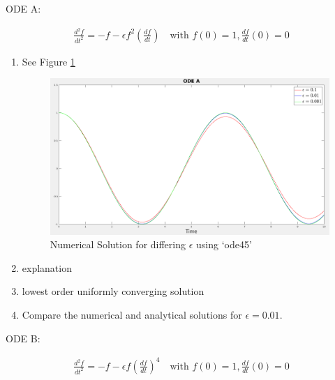 \documentclass{article}
\begin{document}
\vspace{20pt}

ODE A: 

\begin{gather*}
    \frac{d^2f}{dt^2} = -f - \epsilon f^2 \left(\frac{df}{dt}\right) \quad
    \text{with } f(0) = 1, \frac{df}{dt}(0) = 0
\end{gather*}

\begin{enumerate}[label=\alph*.]
    \item See Figure \ref{fig:ODEA_num_sol}
        \begin{figure}[ht]
            \centering
            \includegraphics[width=\textwidth]{images/ODEA.png}
            \caption{Numerical Solution for differing $\epsilon$ using `ode45'}
            \label{fig:ODEA_num_sol}
        \end{figure}
    \item explanation
    \item lowest order uniformly converging solution
    \item Compare the numerical and analytical solutions for $\epsilon = 0.01$. 
\end{enumerate}

\vspace{20pt}

ODE B: 

\begin{gather*}
    \frac{d^2f}{dt^2} = -f - \epsilon f \left(\frac{df}{dt}\right)^4 \quad
    \text{with } f(0) = 1, \frac{df}{dt}(0) = 0
\end{gather*}
\end{document}
